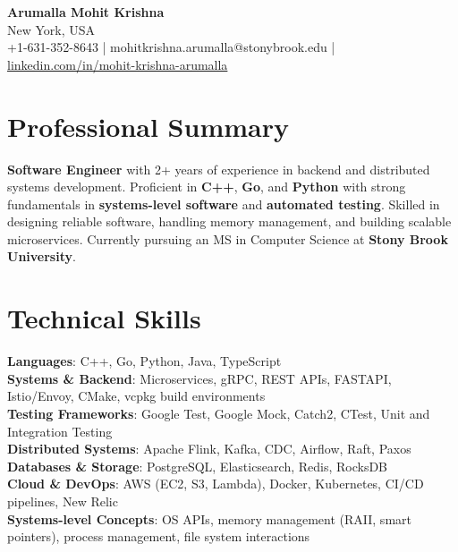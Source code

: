 \documentclass[letterpaper,11pt]{article}
\begin{document}
\begin{center}
  {\Large \textbf{Arumalla Mohit Krishna}} \\
  New York, USA \\
  +1-631-352-8643 \enspace | \enspace mohitkrishna.arumalla@stonybrook.edu \enspace | \enspace \href{https://www.linkedin.com/in/mohit-krishna-arumalla}{linkedin.com/in/mohit-krishna-arumalla}
\end{center}

\section{Professional Summary}
  \begin{itemize}[leftmargin=0.15in, label={}]
    \small{\item{
     \textbf{Software Engineer} with 2+ years of experience in backend and distributed systems development. Proficient in \textbf{C++}, \textbf{Go}, and \textbf{Python} with strong fundamentals in \textbf{systems-level software} and \textbf{automated testing}. Skilled in designing reliable software, handling memory management, and building scalable microservices. Currently pursuing an MS in Computer Science at \textbf{Stony Brook University}.
    }}
  \end{itemize}
\vspace{-16pt}

\section{Technical Skills}
 \begin{itemize}[leftmargin=0.15in, label={}]
    \small{\item{
     \textbf{Languages}: C++, Go, Python, Java, TypeScript \\
     \textbf{Systems \& Backend}: Microservices, gRPC, REST APIs, FASTAPI, Istio/Envoy, CMake, vcpkg build environments \\
     \textbf{Testing Frameworks}: Google Test, Google Mock, Catch2, CTest, Unit and Integration Testing \\
     \textbf{Distributed Systems}: Apache Flink, Kafka, CDC, Airflow, Raft, Paxos \\
     \textbf{Databases \& Storage}: PostgreSQL, Elasticsearch, Redis, RocksDB \\
     \textbf{Cloud \& DevOps}: AWS (EC2, S3, Lambda), Docker, Kubernetes, CI/CD pipelines, New Relic \\
     \textbf{Systems-level Concepts}: OS APIs, memory management (RAII, smart pointers), process management, file system interactions \\
    }}
 \end{itemize}
\vspace{-16pt}
\end{document}
